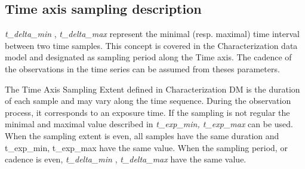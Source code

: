 \documentclass[11pt,a4paper]{ivoa}
\begin{document}
\subsection{Time axis sampling description}
\emph{t\_delta\_min }, \emph{t\_delta\_max}  represent the minimal (resp. maximal) time interval between two time samples.
This concept is covered in the Characterization data model \citep{2008ivoa.spec.0325L} and designated as sampling period along the Time axis. 
The cadence of the observations in the time series  can be assumed from theses parameters. 
 
 The Time Axis Sampling Extent defined in Characterization DM is the duration of each sample and may vary along the time sequence. 
 During the observation process, it corresponds to an exposure time. 
 If the sampling is not regular the minimal and maximal value described in \emph{ t\_exp\_min, t\_exp\_max} can be used. 
When the sampling extent  is even, all samples have the same duration and  t\_exp\_min, t\_exp\_max have the same value. 
When the sampling period, or cadence  is even, \emph{t\_delta\_min }, \emph{t\_delta\_max} have the same value. 
\end{document}
